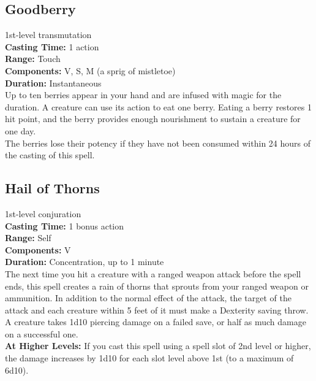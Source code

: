 \documentclass[11pt, A4paper, english]{article}
\begin{document}
		\subsection{Goodberry}
1st-level transmutation \\
\textbf{Casting Time:} 1 action \\
\textbf{Range:} Touch \\
\textbf{Components:} V, S, M (a sprig of mistletoe) \\
\textbf{Duration:} Instantaneous \\
Up to ten berries appear in your hand and are infused with magic for the duration. A creature can use its action to eat one berry. Eating a berry restores 1 hit point, and the berry provides enough nourishment to sustain a creature for one day. \\
The berries lose their potency if they have not been consumed within 24 hours of the casting of this spell.

		\subsection{Hail of Thorns}
1st-level conjuration \\
\textbf{Casting Time:} 1 bonus action \\
\textbf{Range:} Self \\
\textbf{Components:} V \\
\textbf{Duration:} Concentration, up to 1 minute \\
The next time you hit a creature with a ranged weapon attack before the spell ends, this spell creates a rain of thorns that sprouts from your ranged weapon or ammunition. In addition to the normal effect of the attack, the target of the attack and each creature within 5 feet of it must make a Dexterity saving throw. A creature takes 1d10	 piercing damage on a failed save, or half as much damage on a successful one. \\
\textbf{At Higher Levels:} If you cast this spell using a spell slot of 2nd level or higher, the damage increases by 1d10 for each slot level above 1st (to a maximum of 6d10).
\end{document}
